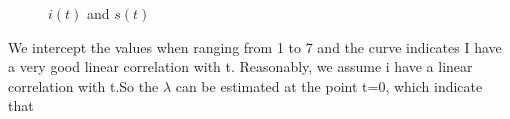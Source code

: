 \documentclass[12pt]{article}
\begin{document}
\begin{figure}[h]
\centering
{}
\caption{$i(t)$ and $s(t)$}
\label{ist}
\end{figure}

We intercept the values when ranging from 1 to 7 and the curve indicates I have a very good linear correlation with t. Reasonably, we assume i have a linear correlation with t.So the $\lambda$ can be estimated at the point t=0, which indicate that
\begin{equation}
\end{equation}
\end{document}
